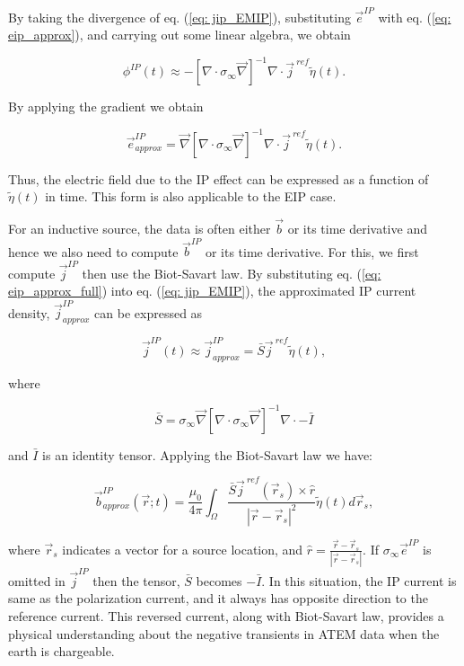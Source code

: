 \documentclass[letterpaper,11pt]{article}
\renewcommand{\div}{\nabla\cdot}
\newcommand{\grad}{\vec \nabla}
\newcommand{\siginf}{\sigma_\infty}
\renewcommand {\j}  { {\vec j} }
\renewcommand {\b}  { {\vec b} }
\newcommand {\e}  { {\vec e} }
\newcommand{\peta}{\tilde{\eta}}
\newcommand{\jref}{\j^{\ ref}}
\begin{document}
By taking the divergence of  eq. (\ref{eq: jip_EMIP}), substituting  $\e^{IP}$ with eq. (\ref{eq: eip_approx}), and carrying out some linear algebra, we obtain
\begin{linenomath*}
\begin{equation}
  \phi^{IP}(t) \approx -[\div \siginf\grad]^{-1}\div\jref\peta(t).
  \label{eq: phiIPapprox_general}
\end{equation}
\end{linenomath*}
By applying the gradient we obtain 
\begin{linenomath*}
\begin{equation}
    \e^{IP}_{approx} = \grad[\div \siginf\grad]^{-1}\div\jref\peta(t).
    \label{eq: eip_approx_full}
\end{equation}
\end{linenomath*}
Thus, the electric field due to the IP effect can be expressed as a function of $\peta(t)$ in time. 
This form is also applicable to the  EIP case.   

For an inductive source, the data is often either $\b$ or its time derivative and hence we also need to compute $\b^{IP}$ or its time derivative.
For this, we first compute $\j^{IP}$ then use the Biot-Savart law. 
By substituting eq. (\ref{eq: eip_approx_full}) into eq. (\ref{eq: jip_EMIP}), the approximated IP current density, $\j^{IP}_{approx}$ can be expressed as
\begin{linenomath*}
\begin{equation}
  \j^{IP}(t) \approx \j^{IP}_{approx} = \bar{S}\jref\peta(t),
  \label{eq: jip_approx}
\end{equation}
\end{linenomath*}
where
\begin{linenomath*}
\begin{equation}
  \bar{S} = \siginf\grad[\div \siginf\grad]^{-1}\div-\bar{I}
\end{equation}
\end{linenomath*}
and $\bar{I}$ is an identity tensor. 
Applying the Biot-Savart law we have:
\begin{linenomath*}
\begin{equation}
  \b^{IP}_{approx}(\vec{r}; t) = \frac{\mu_0}{4\pi}\int_{\Omega}  \frac{\bar{S}\j^{\ ref}(\vec{r}_s)\times\hat{r}}{|\vec{r}-\vec{r}_s|^2}\peta(t)d\vec{r}_s,
  \label{eq: BiotbIP_approx}
\end{equation}
\end{linenomath*}
where $\vec{r}_s$ indicates a vector for a source location, and $\hat{r}=\frac{\vec{r}-\vec{r}_s}{|\vec{r}-\vec{r}_s|}$.
If $\siginf\e^{IP}$ is omitted in  $\j^{IP}$ then the tensor, $\bar{S}$ becomes $-\bar{I}$. 
In this situation, the IP current is same as the polarization current, and it always has opposite direction to the reference current. 
This reversed current, along with Biot-Savart law,  provides a physical understanding about the negative transients in ATEM data when the earth is chargeable. 
\end{document}
